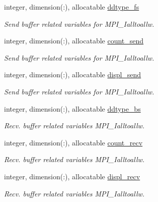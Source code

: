 \begin{DoxyCompactItemize}
\item 
integer, dimension(\+:), allocatable \mbox{\hyperlink{structpascal__tdma_1_1ptdma__plan__many_ad95f6ed58387dd66baecf53ed5fab7e8}{ddtype\+\_\+fs}}
\begin{DoxyCompactList}\small\item\em Send buffer related variables for M\+P\+I\+\_\+\+Ialltoallw. \end{DoxyCompactList}\item 
integer, dimension(\+:), allocatable \mbox{\hyperlink{structpascal__tdma_1_1ptdma__plan__many_ab7a5a4be85650cfe4dfc30fd83b132d7}{count\+\_\+send}}
\begin{DoxyCompactList}\small\item\em Send buffer related variables for M\+P\+I\+\_\+\+Ialltoallw. \end{DoxyCompactList}\item 
integer, dimension(\+:), allocatable \mbox{\hyperlink{structpascal__tdma_1_1ptdma__plan__many_a1c7544758e7ccfcd3b07e91caf0d8f3d}{displ\+\_\+send}}
\begin{DoxyCompactList}\small\item\em Send buffer related variables for M\+P\+I\+\_\+\+Ialltoallw. \end{DoxyCompactList}\end{DoxyCompactItemize}

\textbf{ }\par
\begin{DoxyCompactItemize}
\item 
integer, dimension(\+:), allocatable \mbox{\hyperlink{structpascal__tdma_1_1ptdma__plan__many_a54ddb10078b443daf47204cdcd8e7f8f}{ddtype\+\_\+bs}}
\begin{DoxyCompactList}\small\item\em Recv. buffer related variables M\+P\+I\+\_\+\+Ialltoallw. \end{DoxyCompactList}\item 
integer, dimension(\+:), allocatable \mbox{\hyperlink{structpascal__tdma_1_1ptdma__plan__many_a30cebfb14bfcc955d3e98d9b1ea5fad7}{count\+\_\+recv}}
\begin{DoxyCompactList}\small\item\em Recv. buffer related variables M\+P\+I\+\_\+\+Ialltoallw. \end{DoxyCompactList}\item 
integer, dimension(\+:), allocatable \mbox{\hyperlink{structpascal__tdma_1_1ptdma__plan__many_a1801ea6bbff319dd594a5e993bc5d542}{displ\+\_\+recv}}
\begin{DoxyCompactList}\small\item\em Recv. buffer related variables M\+P\+I\+\_\+\+Ialltoallw. \end{DoxyCompactList}\end{DoxyCompactItemize}

